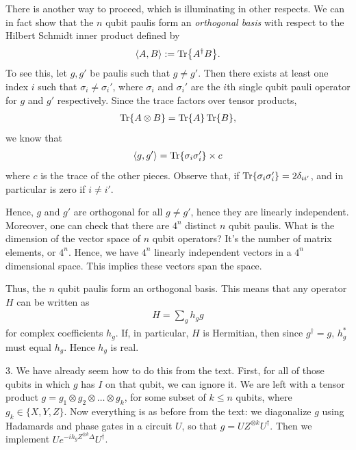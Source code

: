 \documentclass{book}
\begin{document}
    There is another way to proceed, which is illuminating in other respects. We can in fact show that the $n$ qubit paulis form an \emph{orthogonal basis} with respect to the Hilbert Schmidt inner product defined by
    \begin{align}
        \langle A, B \rangle := \Tr{A^\dagger B}.
    \end{align}
    To see this, let $g, g'$ be paulis such that $g\neq g'.$ Then there exists at least one index $i$ such that $\sigma_i \neq \sigma_i'$, where $\sigma_i$ and $\sigma_i'$ are the $i$th single qubit pauli operator for $g$ and $g'$ respectively. Since the trace factors over tensor products,
    \begin{align}
        \Tr{A\otimes B} = \Tr{A}\Tr{B},
    \end{align}
    we know that
    \begin{align}
        \langle g, g' \rangle = \Tr{\sigma_i \sigma_i'} \times c
    \end{align}
    where $c$ is the trace of the other pieces. Observe that, if $\Tr{\sigma_i \sigma_i'} = 2 \delta_{i i'}$, and in particular is zero if $i \neq i'.$ 
    
    Hence, $g$ and $g'$ are orthogonal for all $g \neq g'$, hence they are linearly independent. Moreover, one can check that there are $4^n$ distinct $n$ qubit paulis. What is the dimension of the vector space of $n$ qubit operators? It's the number of matrix elements, or $4^n$. Hence, we have $4^n$ linearly independent vectors in a $4^n$ dimensional space. This implies these vectors span the space.

    Thus, the $n$ qubit paulis form an orthogonal basis. This means that any operator $H$ can be written as 
    \begin{align}
        H = \sum_g h_g g
    \end{align}
    for complex coefficients $h_g$. If, in particular, $H$ is Hermitian, then since $g^\dagger = g$, $h_g^*$ must equal $h_g$. Hence $h_g$ is real.

    3. We have already seem how to do this from the text. First, for all of those qubits in which $g$ has $I$ on that qubit, we can ignore it. We are left with a tensor product $g = g_1 \otimes g_2 \otimes \dots \otimes g_k$, for some subset of $k\leq n$ qubits, where $g_k \in \{X,Y,Z\}$. Now everything is as before from the text: we diagonalize $g$ using Hadamards and phase gates in a circuit $U$, so that $g = U Z^{\otimes k} U^\dagger$. Then we implement $U e^{-i h_g Z^{\otimes k} \Delta}U^\dagger$.
\end{document}
